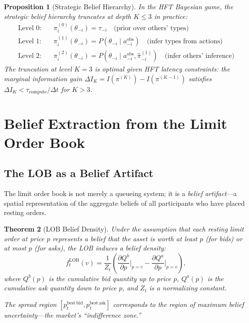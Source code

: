 \documentclass[12pt,a4paper]{article}
\newtheorem{theorem}{Theorem}[section]
\newtheorem{proposition}[theorem]{Proposition}
\theoremstyle{definition}
\begin{document}
\begin{proposition}[Strategic Belief Hierarchy]\label{prop:hierarchy}
In the HFT Bayesian game, the strategic belief hierarchy truncates at depth $K \leq 3$ in practice:
\begin{align}
  \text{Level 0:} &\quad \pi_i^{(0)}(\theta_{-i}) = \tau_{-i} \quad \text{(prior over others' types)} \\
  \text{Level 1:} &\quad \pi_i^{(1)}(\theta_{-i}) = P(\theta_{-i} \mid a_{-i}^{\mathrm{obs}}) \quad \text{(infer types from actions)} \\
  \text{Level 2:} &\quad \pi_i^{(2)}(\theta_{-i}) = P(\theta_{-i} \mid a_{-i}^{\mathrm{obs}}, \hat{\pi}_{-i}^{(1)}) \quad \text{(infer others' inference)}
\end{align}
The truncation at level $K = 3$ is optimal given HFT latency constraints: the marginal information gain $\Delta I_K = I(\pi^{(K)}) - I(\pi^{(K-1)})$ satisfies $\Delta I_K < \tau_{\mathrm{compute}} / \Delta t$ for $K > 3$.
\end{proposition}

\section{Belief Extraction from the Limit Order Book}\label{sec:lob-inference}

\subsection{The LOB as a Belief Artifact}

The limit order book is not merely a queueing system; it is a \emph{belief artifact}---a spatial representation of the aggregate beliefs of all participants who have placed resting orders.

\begin{theorem}[LOB Belief Density]\label{thm:lob-belief}
Under the assumption that each resting limit order at price $p$ represents a belief that the asset is worth at least $p$ (for bids) or at most $p$ (for asks), the LOB induces a belief density:
\begin{equation}\label{eq:lob-belief-density}
  f_t^{\mathrm{LOB}}(v) = \frac{1}{Z_t}\left(\frac{\partial Q^b}{\partial p}\bigg|_{p=v} - \frac{\partial Q^a}{\partial p}\bigg|_{p=v}\right),
\end{equation}
where $Q^b(p)$ is the cumulative bid quantity up to price $p$, $Q^a(p)$ is the cumulative ask quantity down to price $p$, and $Z_t$ is a normalizing constant.

The spread region $[p_t^{\mathrm{best\,bid}}, p_t^{\mathrm{best\,ask}}]$ corresponds to the region of maximum belief uncertainty---the market's ``indifference zone.''
\end{theorem}
\end{document}
